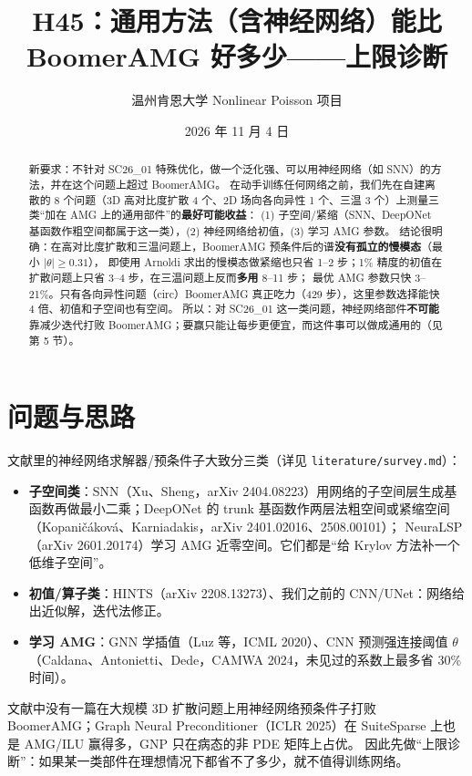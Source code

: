 \documentclass[11pt,a4paper]{ctexart}
\title{H45：通用方法（含神经网络）能比 BoomerAMG 好多少——上限诊断}
\author{温州肯恩大学 \quad Nonlinear Poisson 项目}
\date{2026 年 11 月 4 日}
\begin{document}
\maketitle

\begin{abstract}
新要求：不针对 SC26\_01 特殊优化，做一个泛化强、可以用神经网络（如 SNN）的方法，并在这个问题上超过 BoomerAMG。
在动手训练任何网络之前，我们先在自建离散的 8 个问题（3D 高对比度扩散 4 个、2D 场向各向异性 1 个、三温 3 个）上测量三类“加在 AMG 上的通用部件”的\textbf{最好可能收益}：
(1) 子空间/紧缩（SNN、DeepONet 基函数作粗空间都属于这一类），(2) 神经网络给初值，(3) 学习 AMG 参数。
结论很明确：在高对比度扩散和三温问题上，BoomerAMG 预条件后的谱\textbf{没有孤立的慢模态}（最小 $|\theta|\ge0.31$），
即使用 Arnoldi 求出的慢模态做紧缩也只省 1--2 步；1\% 精度的初值在扩散问题上只省 3--4 步，在三温问题上反而\textbf{多用} 8--11 步；
最优 AMG 参数只快 3--21\%。只有各向异性问题（circ）BoomerAMG 真正吃力（429 步），这里参数选择能快 4 倍、初值和子空间也有空间。
所以：对 SC26\_01 这一类问题，神经网络部件\textbf{不可能}靠减少迭代打败 BoomerAMG；要赢只能让每步更便宜，而这件事可以做成通用的（见第 5 节）。
\end{abstract}

\section{问题与思路}
文献里的神经网络求解器/预条件子大致分三类（详见 \texttt{literature/survey.md}）：
\begin{itemize}
\item \textbf{子空间类}：SNN（Xu、Sheng，arXiv 2404.08223）用网络的子空间层生成基函数再做最小二乘；DeepONet 的 trunk 基函数作两层法粗空间或紧缩空间（Kopaničáková、Karniadakis，arXiv 2401.02016、2508.00101）；
NeuraLSP（arXiv 2601.20174）学习 AMG 近零空间。它们都是“给 Krylov 方法补一个低维子空间”。
\item \textbf{初值/算子类}：HINTS（arXiv 2208.13273）、我们之前的 CNN/UNet：网络给出近似解，迭代法修正。
\item \textbf{学习 AMG}：GNN 学插值（Luz 等，ICML 2020）、CNN 预测强连接阈值 $\theta$（Caldana、Antonietti、Dede，CAMWA 2024，未见过的系数上最多省 30\% 时间）。
\end{itemize}
文献中没有一篇在大规模 3D 扩散问题上用神经网络预条件子打败 BoomerAMG；Graph Neural Preconditioner（ICLR 2025）在 SuiteSparse 上也是 AMG/ILU 赢得多，GNP 只在病态的非 PDE 矩阵上占优。
因此先做“上限诊断”：如果某一类部件在理想情况下都省不了多少，就不值得训练网络。
\end{document}
